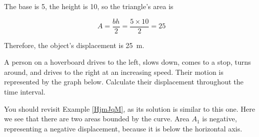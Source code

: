 \documentclass[main-physics.tex]{subfiles}
\begin{document}
\begin{center}
\end{center}

The base is 5, the height is 10, so the triangle's area is

\begin{equation*}
    A = \frac{bh}{2} = \frac{5 \times 10}{2} = 25
\end{equation*}

Therefore, the object's displacement is \SI{25}{m}.

\begin{example} \label{BksbmH}
    A person on a hoverboard drives to the left, slows down, comes to a stop, turns around, and drives to the right at an increasing speed. Their motion is represented by the graph below. Calculate their displacement throughout the time interval.
\end{example}

\begin{center}
\end{center}

\Solution You should revisit Example \ref{HjmJqM}, as its solution is similar to this one. Here we see that there are two areas bounded by the curve. Area $A_1$ is negative, representing a negative displacement, because it is below the horizontal axis.  
\end{document}
